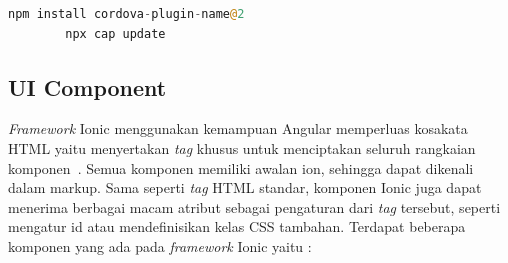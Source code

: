 \begin{lstlisting}[language=php, label={lst:updateCordova}, caption=Kode untuk Memperbarui Cordova Plugins]
		npm install cordova-plugin-name@2
		npx cap update
\end{lstlisting} 


\subsection{UI Component}
\label{subsec:uiComponent}
{\it Framework} Ionic menggunakan kemampuan Angular memperluas kosakata HTML yaitu menyertakan {\it tag} khusus untuk menciptakan seluruh rangkaian komponen~\cite{griffith:17:mobile}. Semua komponen memiliki awalan ion, sehingga dapat dikenali dalam markup. Sama seperti {\it tag} HTML standar, komponen Ionic juga dapat menerima berbagai macam atribut sebagai pengaturan dari {\it tag} tersebut, seperti mengatur id atau mendefinisikan kelas CSS tambahan. Terdapat beberapa komponen yang ada pada {\it framework} Ionic yaitu :
